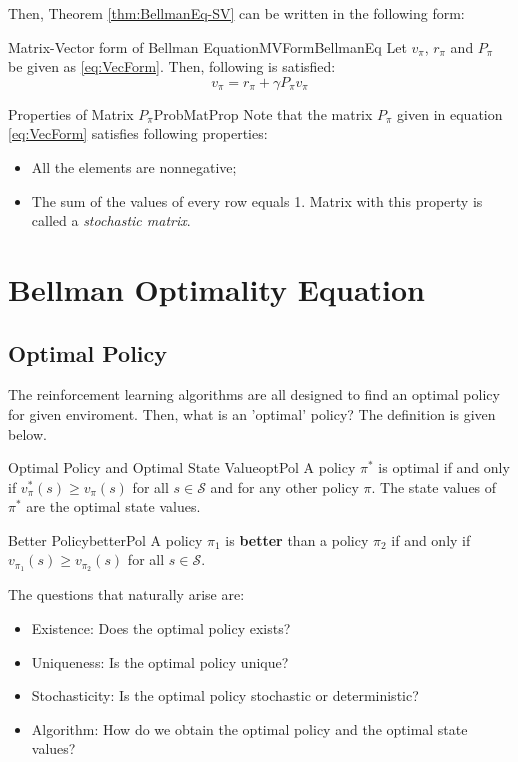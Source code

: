         Then, Theorem \ref{thm:BellmanEq-SV} can be written in the following form:
        \begin{thm}{Matrix-Vector form of Bellman Equation}{MVFormBellmanEq}
        Let $v_\pi$, $r_\pi$ and $P_\pi$ be given as \ref{eq:VecForm}. Then, following is satisfied:
            \begin{equation}
                v_\pi = r_\pi + \gamma P_\pi v_\pi
            \end{equation}
        \end{thm}
        \begin{rem}{Properties of Matrix $P_\pi$}{ProbMatProp}
            Note that the matrix $P_\pi$ given in equation \ref{eq:VecForm} satisfies following properties:
            \begin{itemize}
                \item All the elements are nonnegative;
                \item The sum of the values of every row equals 1. Matrix with this property is called a \emph{stochastic matrix}.
            \end{itemize}
        \end{rem}

\section{Bellman Optimality Equation}
    \subsection{Optimal Policy}
        The reinforcement learning algorithms are all designed to find an optimal policy for
        given enviroment. Then, what is an 'optimal' policy? The definition is given below.
        \begin{defn}{Optimal Policy and Optimal State Value}{optPol}
            A policy $\pi^*$ is optimal if and only if $v_\pi^*(s) \geq v_\pi(s)$ for all $s \in \mathcal{S}$
            and for any other policy $\pi$. The state values of $\pi^*$ are the optimal state values.
        \end{defn}
        \begin{defn}{Better Policy}{betterPol}
            A policy $\pi_1$ is \textbf{better} than a policy $\pi_2$ if and only if
            $v_{\pi_1}(s) \geq v_{\pi_2}(s)$ for all $s \in \mathcal{S}$.
        \end{defn}
        The questions that naturally arise are:
        \begin{itemize}
            \item Existence: Does the optimal policy exists?
            \item Uniqueness: Is the optimal policy unique?
            \item Stochasticity: Is the optimal policy stochastic or deterministic?
            \item Algorithm: How do we obtain the optimal policy and the optimal state values?
        \end{itemize}
